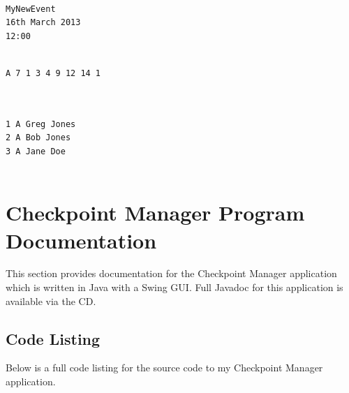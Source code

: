 \documentclass{article}
\begin{document}
\begin{center}
	\begin{lstlisting}[showstringspaces=false, caption={name.txt file output from listing \ref{lst:create-output}}]
	
MyNewEvent
16th March 2013
12:00

	\end{lstlisting}
\end{center}

\begin{center}
	\begin{lstlisting}[showstringspaces=false, caption={courses.txt file output from listing \ref{lst:create-output}}]

A 7 1 3 4 9 12 14 1 
		
	\end{lstlisting}
\end{center}

\begin{center}
	\begin{lstlisting}[showstringspaces=false, caption={entrants.txt file output from listing \ref{lst:create-output}}]

1 A Greg Jones
2 A Bob Jones
3 A Jane Doe	
		
	\end{lstlisting}
\end{center}

\section{Checkpoint Manager Program Documentation}
This section provides documentation for the Checkpoint Manager application which is written in Java with a Swing GUI. Full Javadoc for this application is available via the CD.

\subsection{Code Listing}
Below is a full code listing for the source code to my Checkpoint Manager application.




\end{document}
